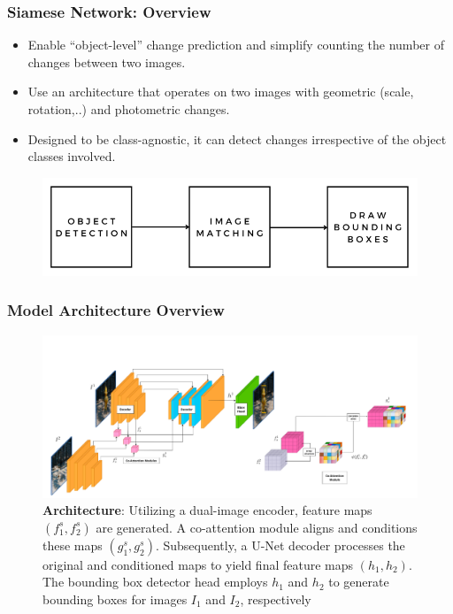 \documentclass[13.5pt,aspecratio=169, xcolor=dvipsnames]{beamer}
\begin{document}
\begin{frame}
    \onehalfspacing
        \frametitle{Siamese Network: Overview}
        \begin{itemize}
            \item Enable “object-level” change prediction and simplify counting the number of changes between two images.
            \item Use an architecture that operates on two images with
            geometric (scale, rotation,..) and photometric changes.
            \item Designed to be
            class-agnostic, it can detect changes irrespective of
            the object classes involved. 
        \end{itemize}
        
        \begin{figure}
            \centering
            \includegraphics[scale=0.5]{Siamese_network_1.png}
        \end{figure}
        
\end{frame}



\begin{frame}
    \onehalfspacing
        \frametitle{Model Architecture Overview}
        \begin{figure}
            \centering
            \includegraphics[width=\linewidth]{Siamese_network_architecture.png}
            \caption{\textbf{Architecture}: Utilizing a dual-image encoder, feature maps $(f^s_1, f^s_2)$ are generated. A co-attention module aligns and conditions these maps $(g^s_1, g^s_2)$. Subsequently, a U-Net decoder processes the original and conditioned maps to yield final feature maps $(h_1, h_2)$. The bounding box detector head employs $h_1$ and $h_2$ to generate bounding boxes for images $I_1$ and $I_2$, respectively}
        \end{figure}
        
\end{frame}
\end{document}
